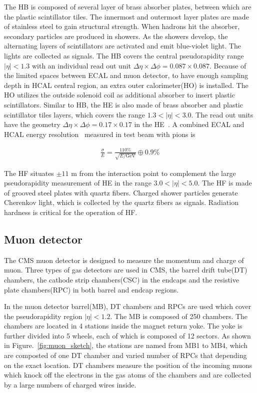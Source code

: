 The HB is composed of  several layer of brass absorber plates, between which are the plastic scintillator tiles. The innermost and outermost layer plates are made of stainless steel to gain structural strength. When hadrons hit the absorber, secondary particles are produced in showers. As the showers develop, the alternating layers of scintillators are activated and emit blue-violet light. The lights are collected as signals. The HB covers the central pseudorapidity range $|\eta|<1.3$ with an individual read out unit $\Delta \eta\times\Delta\phi=0.087\times 0.087$. Because of the limited spaces between ECAL and muon detector, to have enough sampling depth in HCAL central region, an extra outer calorimeter(HO) is installed. The HO utilizes the outside solenoid coil as additional absorber to insert plastic scintillators. Similar to HB, the HE is also made of brass absorber and plastic scintillator tiles layers, which covers the range $1.3<|\eta|<3.0$. The read out units have the geometry $\Delta \eta\times\Delta\phi=0.17\times 0.17$ in the HE~\cite{CMS_experiment}. A combined ECAL and HCAL energy resolution~\cite{HCAL_reso} measured in test beam with pions is 

\begin{align*}
\frac{\sigma}{E}=\frac{110\%}{\sqrt{E/\textrm{GeV}}}\oplus 0.9\%
\end{align*}

The HF situates $\pm11$ m from the interaction point to complement the large pseudorapidity measurement of HE in the range $3.0<|\eta|<5.0$. The HF is made of grooved steel plates with quartz fibers. Charged shower particles generate Cherenkov light, which is collected by the quartz fibers as signals. Radiation hardness is critical for the operation of HF.   



\subsection{Muon detector}
The CMS muon detector is designed to measure the momentum and charge of muon. Three types of gas detectors are used in CMS, the barrel drift tube(DT) chambers, the cathode strip chambers(CSC) in the endcaps and the resistive plate chambers(RPC) in both barrel and endcap regions. 

In the muon detector barrel(MB), DT chambers and RPCs are used which cover the pseudorapidity region $|\eta|<1.2$. The MB is composed of 250 chambers. The chambers are located in 4 stations inside the magnet return yoke. The yoke is further divided into 5 wheels, each of which is composed of 12 sectors. As shown in Figure.~\ref{fig:muon_sketch}, the stations are named from MB1 to MB4, which are composted of one DT chamber and varied number of RPCs that depending on the exact location. DT chambers measure the position of the incoming muons which knock off the electrons in the gas atoms of the chambers and are collected by a large numbers of charged wires inside.%

